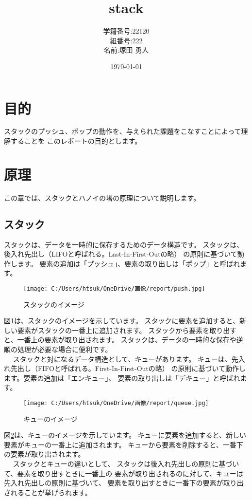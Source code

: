 \documentclass[a4j]{jarticle}
\begin{document}
\title{stack}
\author{学籍番号:22120 \\
  組番号:222\\
  名前:塚田 勇人\\}
\date{\today}
\maketitle

\newpage
\tableofcontents
\newpage

\section{目的}
スタックのプッシュ、ポップの動作を、与えられた課題をこなすことによって理解することを
このレポートの目的とします。

\section{原理}
この章では、スタックとハノイの塔の原理について説明します。
\subsection{スタック}
スタックは、データを一時的に保存するためのデータ構造です。
スタックは、後入れ先出し（LIFOと呼ばれる。Last-In-First-Outの略）
の原則に基づいて動作します。
要素の追加は「プッシュ」、要素の取り出しは「ポップ」と呼ばれます。
\begin{figure}[h]
  \centering
  \texttt{[image: C:/Users/htsuk/OneDrive/画像/report/push.jpg]}
  \caption{スタックのイメージ}
  \label{fig:stack}
\end{figure}

図\ref{fig:stack}は、スタックのイメージを示しています。
スタックに要素を追加すると、新しい要素がスタックの一番上に追加されます。
スタックから要素を取り出すと、一番上の要素が取り出されます。
スタックは、データの一時的な保存や逆順の処理が必要な場合に便利です。
\\~~
スタックと対になるデータ構造として、キューがあります。
キューは、先入れ先出し（FIFOと呼ばれる。First-In-First-Outの略）
の原則に基づいて動作します。要素の追加は「エンキュー」、
要素の取り出しは「デキュー」と呼ばれます。
\newpage
\begin{figure}[h]
  \centering
  \texttt{[image: C:/Users/htsuk/OneDrive/画像/report/queue.jpg]}
  \caption{キューのイメージ}
  \label{fig:queue}
\end{figure}
図\ref{fig:queue}は、キューのイメージを示しています。
キューに要素を追加すると、新しい要素がキューの一番上に追加されます。
キューから要素を削除すると、一番下の要素が取り出されます。
\\~~
スタックとキューの違いとして、
スタックは後入れ先出しの原則に基づいて、要素を取り出すときに一番上の
要素が取り出されるのに対して、キューは先入れ先出しの原則に基づいて、
要素を取り出すときに一番下の要素が取り出されることが挙げられます。
\end{document}
